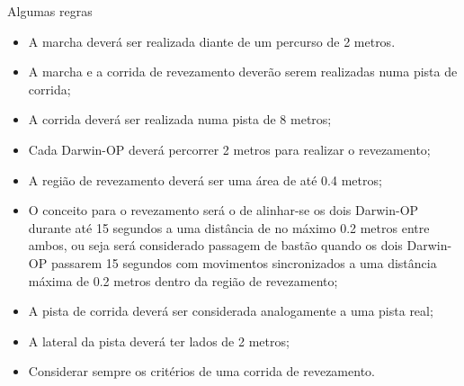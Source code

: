 \documentclass[aspectratio=169]{beamer}
\begin{document}
\begin{frame}[t]{Algumas regras}
    \begin{itemize}
        \item A marcha deverá ser realizada diante de um percurso de 2 metros.
        \item A marcha e a corrida de revezamento deverão serem realizadas numa pista de corrida;
        \item A corrida deverá ser realizada numa pista de 8 metros;
        \item Cada Darwin-OP deverá percorrer 2 metros para realizar o revezamento;
        \item A região de revezamento deverá ser uma área de até 0.4 metros;
        \item O conceito para o revezamento será o de alinhar-se os dois Darwin-OP durante até 15 segundos a uma distância de no máximo 0.2 metros entre ambos, ou seja será considerado passagem de bastão quando os dois Darwin-OP passarem 15 segundos com movimentos sincronizados a uma distância máxima de 0.2 metros dentro da região de revezamento;
        \item A pista de corrida deverá ser considerada analogamente a uma pista real;
        \item A lateral da pista deverá ter lados de 2 metros;
        \item Considerar sempre os critérios de uma corrida de revezamento.
    \end{itemize}
   
\end{frame}
\end{document}
